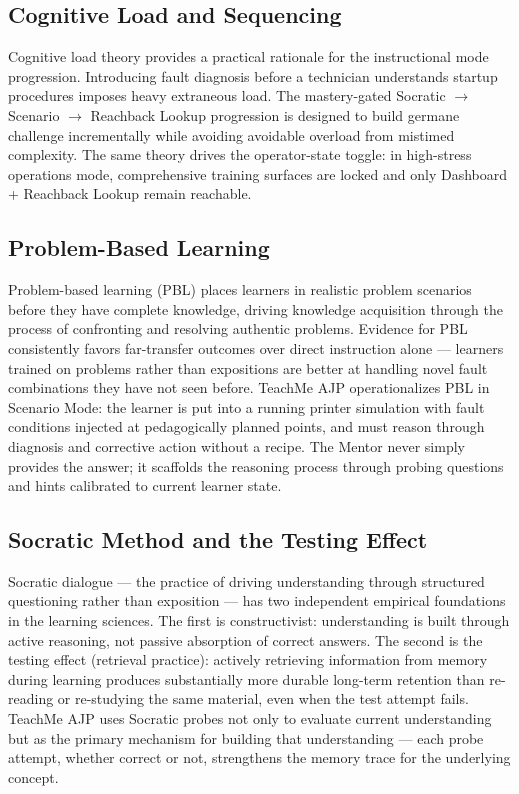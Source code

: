 \documentclass[10pt,letterpaper,twocolumn]{article}
\newcommand{\arrowto}{$\rightarrow$}
\begin{document}
\subsection{Cognitive Load and Sequencing}
Cognitive load theory provides a practical rationale for the instructional mode progression. Introducing fault diagnosis before a technician understands startup procedures imposes heavy extraneous load. The mastery-gated Socratic \arrowto{} Scenario \arrowto{} Reachback Lookup progression is designed to build germane challenge incrementally while avoiding avoidable overload from mistimed complexity. The same theory drives the operator-state toggle: in high-stress operations mode, comprehensive training surfaces are locked and only Dashboard + Reachback Lookup remain reachable.

\subsection{Problem-Based Learning}
Problem-based learning (PBL) places learners in realistic problem scenarios before they have complete knowledge, driving knowledge acquisition through the process of confronting and resolving authentic problems. Evidence for PBL consistently favors far-transfer outcomes over direct instruction alone --- learners trained on problems rather than expositions are better at handling novel fault combinations they have not seen before. TeachMe AJP operationalizes PBL in Scenario Mode: the learner is put into a running printer simulation with fault conditions injected at pedagogically planned points, and must reason through diagnosis and corrective action without a recipe. The Mentor never simply provides the answer; it scaffolds the reasoning process through probing questions and hints calibrated to current learner state.

\subsection{Socratic Method and the Testing Effect}
Socratic dialogue --- the practice of driving understanding through structured questioning rather than exposition --- has two independent empirical foundations in the learning sciences. The first is constructivist: understanding is built through active reasoning, not passive absorption of correct answers. The second is the testing effect (retrieval practice): actively retrieving information from memory during learning produces substantially more durable long-term retention than re-reading or re-studying the same material, even when the test attempt fails. TeachMe AJP uses Socratic probes not only to evaluate current understanding but as the primary mechanism for building that understanding --- each probe attempt, whether correct or not, strengthens the memory trace for the underlying concept.
\end{document}
